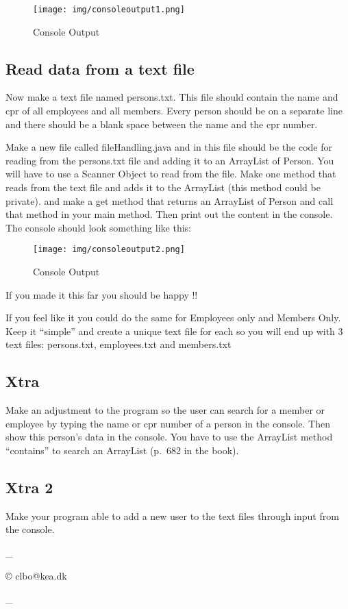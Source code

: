 \begin{figure}
\centering
\texttt{[image: img/consoleoutput1.png]}
\caption{Console Output}
\end{figure}

\hypertarget{read-data-from-a-text-file}{%
\subsection{Read data from a text
file}\label{read-data-from-a-text-file}}

Now make a text file named persons.txt. This file should contain the
name and cpr of all employees and all members. Every person should be on
a separate line and there should be a blank space between the name and
the cpr number.

Make a new file called fileHandling.java and in this file should be the
code for reading from the persons.txt file and adding it to an ArrayList
of Person. You will have to use a Scanner Object to read from the file.
Make one method that reads from the text file and adds it to the
ArrayList (this method could be private). and make a get method that
returns an ArrayList of Person and call that method in your main method.
Then print out the content in the console. The console should look
something like this:

\begin{figure}
\centering
\texttt{[image: img/consoleoutput2.png]}
\caption{Console Output}
\end{figure}

If you made it this far you should be happy !!

If you feel like it you could do the same for Employees only and Members
Only. Keep it ``simple'' and create a unique text file for each so you
will end up with 3 text files: persons.txt, employees.txt and
members.txt

\hypertarget{xtra}{%
\subsection{Xtra}\label{xtra}}

Make an adjustment to the program so the user can search for a member or
employee by typing the name or cpr number of a person in the console.
Then show this person's data in the console. You have to use the
ArrayList method ``contains'' to search an ArrayList (p.~682 in the
book).

\hypertarget{xtra-2}{%
\subsection{Xtra 2}\label{xtra-2}}

Make your program able to add a new user to the text files through input
from the console.

\_

© clbo@kea.dk

\_
